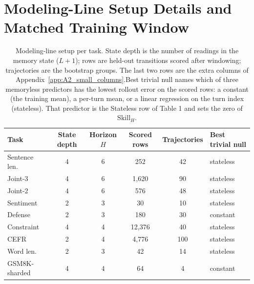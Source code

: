 \section{Modeling-Line Setup Details and Matched Training Window}
\label{app:A3_window}

\begin{table}[t]
\centering
\caption{Modeling-line setup per task. State depth is the number of readings in the memory state ($L+1$); rows are held-out transitions scored after windowing; trajectories are the bootstrap groups. The last two rows are the extra columns of Appendix~\ref{app:A2_small_columns}.Best trivial null names which of three memoryless predictors has the lowest rollout error on the scored rows: a constant (the training mean), a per-turn mean, or a linear regression on the turn index (stateless). That predictor is the Stateless row of Table 1 and sets the zero of $\mathrm{Skill}_H$.}
\label{tab:setup_per_task}
\footnotesize
\setlength{\tabcolsep}{5pt}
\begin{tabular}{lccccl}
\toprule
Task & State depth & Horizon $H$ & Scored rows & Trajectories & Best trivial null \\
\midrule
Sentence len. & 4 & 6 & 252 & 42 & stateless \\  %
Joint-3 & 4 & 6 & 1,620 & 90 & stateless \\  %
Joint-2 & 4 & 6 & 576 & 48 & stateless \\  %
Sentiment & 2 & 3 & 30 & 10 & stateless \\  %
Defense & 2 & 3 & 180 & 30 & constant \\  %
Constraint & 4 & 4 & 12,376 & 40 & stateless \\  %
CEFR & 2 & 4 & 4,776 & 100 & stateless \\  %
\midrule
Word len. & 2 & 3 & 42 & 14 & stateless \\  %
GSM8K-sharded & 4 & 4 & 64 & 4 & constant \\  %
\bottomrule
\end{tabular}
\end{table}

